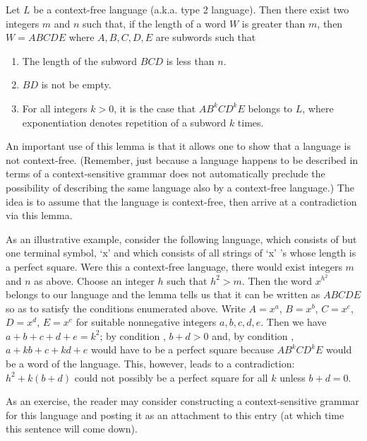 \documentclass{article}
\begin{document}
Let $L$ be a context-free language (a.k.a. type 2 language).  Then there exist
two integers $m$ and $n$ such that, if the length of a word $W$ is greater
than $m$, then $W = ABCDE$ where $A,B,C,D,E$ are subwords such that
\begin{enumerate}
\item The length of the subword $BCD$ is less than $n$.
\item $BD$ is not be empty.
\item For all integers $k > 0$, it is the case that $AB^kCD^kE$ belongs to $L$,
where exponentiation denotes repetition of a subword $k$ times.
\end{enumerate}

An important use of this lemma is that it allows one to show that a language
is not context-free. (Remember, just because a language happens to be described 
in terms of a context-sensitive grammar does not automatically preclude the
possibility of describing the same language also  by a 
context-free language.)  The idea is to assume that the language is
context-free, then arrive at a contradiction via this lemma.

As an illustrative example, consider the following language, which consists of
but one terminal symbol, `x' and which consists of all strings of `x' 's whose
length is a perfect square.  Were this a context-free language, there would 
exist integers $m$ and $n$ as above.  Choose an integer $h$ such that $h^2 > m$.
Then the word $x^{h^2}$ belongs to our language and the lemma tells us that
it can be written as $ABCDE$ so as to satisfy the conditions enumerated above.
Write $A = x^a$, $B = x^b$, $C = x^c$, $D = x^d$, $E = x^e$ for suitable nonnegative integers $a,b,c,d,e$.  Then we have $a + b + c + d + e = k^2$;
by condition , $b + d > 0$ and, by condition , $a + kb + c + kd + e$ would 
have to be a perfect square because $AB^kCD^kE$ would be a word of the
language.  This, however, leads to a contradiction: $h^2 + k (b + d)$ 
could not possibly be a perfect square for all $k$ unless $b + d = 0$.

As an exercise, the reader may consider constructing a context-sensitive
grammar for this language and posting it as an attachment to this entry 
(at which time this sentence will come down).
\end{document}
